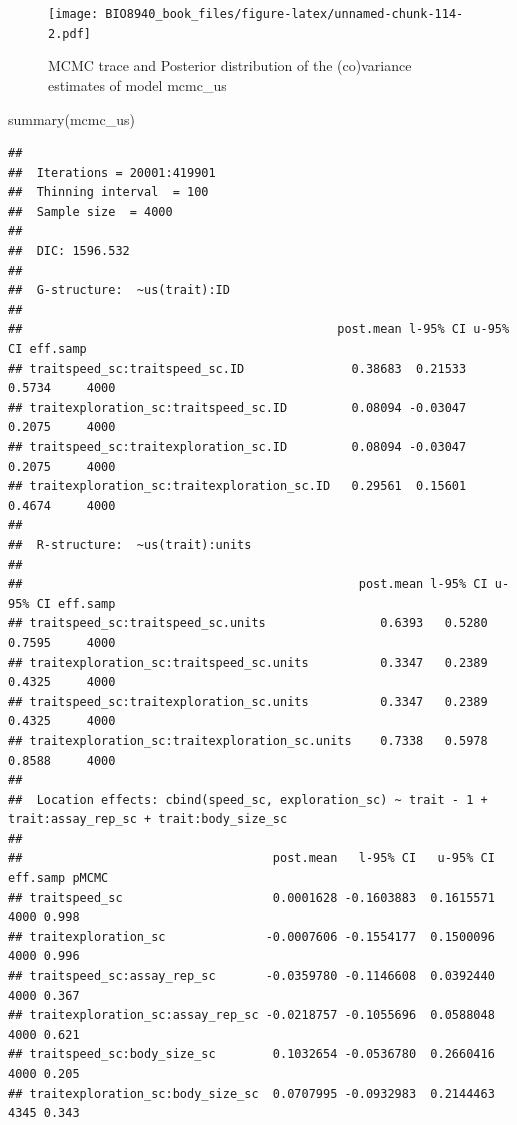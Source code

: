 \documentclass[
  12pt,
]{book}
\newenvironment{Shaded}{\begin{snugshade}}{\end{snugshade}}
\newcommand{\DecValTok}[1]{\textcolor[rgb]{0.00,0.00,0.81}{#1}}
\newcommand{\FunctionTok}[1]{\textcolor[rgb]{0.00,0.00,0.00}{#1}}
\newcommand{\NormalTok}[1]{#1}
\newcommand{\OtherTok}[1]{\textcolor[rgb]{0.56,0.35,0.01}{#1}}
\newcommand{\SpecialCharTok}[1]{\textcolor[rgb]{0.00,0.00,0.00}{#1}}
\begin{document}
\begin{figure}
\centering
\texttt{[image: BIO8940\_book\_files/figure-latex/unnamed-chunk-114-2.pdf]}
\caption{\label{fig:unnamed-chunk-114-2}MCMC trace and Posterior distribution of the (co)variance estimates of model mcmc\_us}
\end{figure}

\begin{Shaded}
\begin{Highlighting}[]
\FunctionTok{summary}\NormalTok{(mcmc\_us)}
\end{Highlighting}
\end{Shaded}

\begin{verbatim}
## 
##  Iterations = 20001:419901
##  Thinning interval  = 100
##  Sample size  = 4000 
## 
##  DIC: 1596.532 
## 
##  G-structure:  ~us(trait):ID
## 
##                                            post.mean l-95% CI u-95% CI eff.samp
## traitspeed_sc:traitspeed_sc.ID               0.38683  0.21533   0.5734     4000
## traitexploration_sc:traitspeed_sc.ID         0.08094 -0.03047   0.2075     4000
## traitspeed_sc:traitexploration_sc.ID         0.08094 -0.03047   0.2075     4000
## traitexploration_sc:traitexploration_sc.ID   0.29561  0.15601   0.4674     4000
## 
##  R-structure:  ~us(trait):units
## 
##                                               post.mean l-95% CI u-95% CI eff.samp
## traitspeed_sc:traitspeed_sc.units                0.6393   0.5280   0.7595     4000
## traitexploration_sc:traitspeed_sc.units          0.3347   0.2389   0.4325     4000
## traitspeed_sc:traitexploration_sc.units          0.3347   0.2389   0.4325     4000
## traitexploration_sc:traitexploration_sc.units    0.7338   0.5978   0.8588     4000
## 
##  Location effects: cbind(speed_sc, exploration_sc) ~ trait - 1 + trait:assay_rep_sc + trait:body_size_sc 
## 
##                                   post.mean   l-95% CI   u-95% CI eff.samp pMCMC
## traitspeed_sc                     0.0001628 -0.1603883  0.1615571     4000 0.998
## traitexploration_sc              -0.0007606 -0.1554177  0.1500096     4000 0.996
## traitspeed_sc:assay_rep_sc       -0.0359780 -0.1146608  0.0392440     4000 0.367
## traitexploration_sc:assay_rep_sc -0.0218757 -0.1055696  0.0588048     4000 0.621
## traitspeed_sc:body_size_sc        0.1032654 -0.0536780  0.2660416     4000 0.205
## traitexploration_sc:body_size_sc  0.0707995 -0.0932983  0.2144463     4345 0.343
\end{verbatim}

\begin{Shaded}
\end{Shaded}
\end{document}
